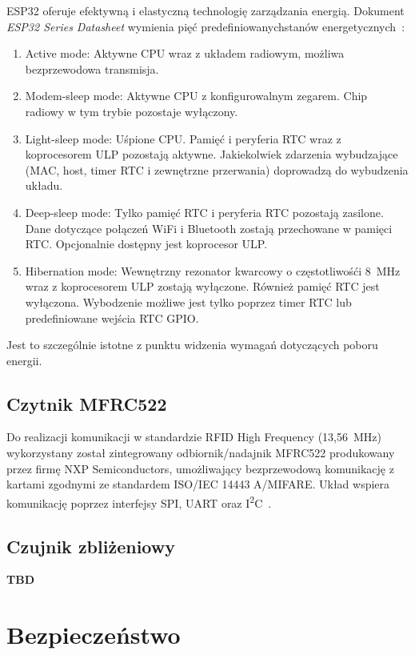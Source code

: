             ESP32 oferuje efektywną i elastyczną technologię zarządzania energią. Dokument \textit{ESP32 Series Datasheet} wymienia pięć predefiniowanychstanów energetycznych~\cite{esp32-ds}:
            \begin{enumerate}
                \item Active mode: Aktywne CPU wraz z układem radiowym, możliwa bezprzewodowa transmisja.
                \item Modem-sleep mode: Aktywne CPU z konfigurowalnym zegarem. Chip radiowy w tym trybie pozostaje wyłączony.
                \item Light-sleep mode: Uśpione CPU. Pamięć i peryferia RTC wraz z koprocesorem ULP pozostają aktywne. Jakiekolwiek zdarzenia wybudzające (MAC, host, timer RTC i zewnętrzne przerwania) doprowadzą do wybudzenia układu.
                \item Deep-sleep mode: Tylko pamięć RTC i peryferia RTC pozostają zasilone. Dane dotyczące połączeń WiFi i Bluetooth zostają przechowane w pamięci RTC. Opcjonalnie dostępny jest koprocesor ULP.
                \item Hibernation mode: Wewnętrzny rezonator kwarcowy o częstotliwośći 8~MHz wraz z koprocesorem ULP zostają wyłączone. Również pamięć RTC jest wyłączona. Wybodzenie możliwe jest tylko poprzez timer RTC lub predefiniowane wejścia RTC GPIO.
            \end{enumerate}
            Jest to szczególnie istotne z punktu widzenia wymagań dotyczących poboru energii.

        \subsection{Czytnik MFRC522}

            Do realizacji komunikacji w standardzie RFID High Frequency (13,56~MHz) wykorzystany został zintegrowany odbiornik/nadajnik MFRC522 produkowany przez firmę NXP Semiconductors, umożliwający bezprzewodową komunikację z kartami zgodnymi ze standardem ISO/IEC 14443 A/MIFARE. Układ wspiera komunikację poprzez interfejsy SPI, UART oraz I\textsuperscript{2}C~\cite{mfrc522-ds}.

        \subsection{Czujnik zbliżeniowy}
            \textbf{TBD}

    \section{Bezpieczeństwo}

